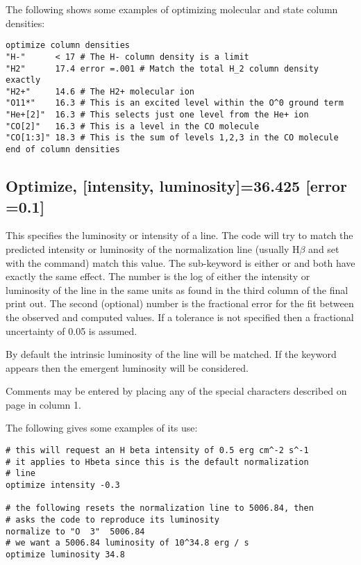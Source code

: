 The following shows some examples of optimizing molecular and state column
densities:
\begin{verbatim}
optimize column densities
"H-"      < 17 # The H- column density is a limit
"H2"      17.4 error =.001 # Match the total H_2 column density exactly
"H2+"     14.6 # The H2+ molecular ion
"O11*"    16.3 # This is an excited level within the O^0 ground term
"He+[2]"  16.3 # This selects just one level from the He+ ion
"CO[2]"   16.3 # This is a level in the CO molecule
"CO[1:3]" 18.3 # This is the sum of levels 1,2,3 in the CO molecule
end of column densities
\end{verbatim}

\subsection{Optimize, [intensity, luminosity]=36.425 [error =0.1]}

This specifies the luminosity or intensity of a line.
The code will
try to match the predicted intensity or luminosity of the
normalization line
(usually H$\beta$ and set with the  command)
match this value.
The
sub-keyword is either  or 
and both have exactly the
same effect.
The number is the log of either the intensity or luminosity
of the line in the same units as found in the third column of
the final print out.
The second (optional) number is the fractional error for the
fit between the observed and computed values.
If a tolerance is not
specified then a fractional uncertainty of 0.05 is assumed.

By default the intrinsic luminosity of the line will be matched.
If the keyword  appears then the
emergent luminosity will be considered.

Comments may be entered by placing any of the special characters
described on page \pageref{sec:CommentsInInput} in column 1.

The following gives some examples of its use:
\begin{verbatim}
# this will request an H beta intensity of 0.5 erg cm^-2 s^-1
# it applies to Hbeta since this is the default normalization
# line
optimize intensity -0.3

# the following resets the normalization line to 5006.84, then
# asks the code to reproduce its luminosity
normalize to "O  3"  5006.84
# we want a 5006.84 luminosity of 10^34.8 erg / s
optimize luminosity 34.8
\end{verbatim}

